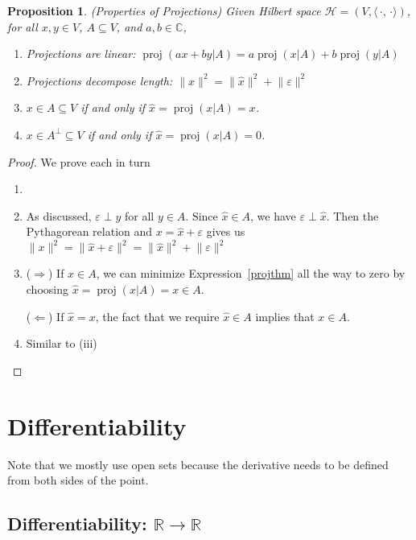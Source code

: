 \documentclass[12pt]{article}
\numberwithin{equation}{section} %
\theoremstyle{plain}
\newtheorem{prop}[thm]{Proposition}
\theoremstyle{definition}
\theoremstyle{remark}
\newcommand{\proj}{\operatorname{proj}}
\newcommand{\calH}{\mathcal{H}}
\newcommand{\R}{\mathbb{R}}
\newcommand{\C}{\mathbb{C}}
\begin{document}
\begin{prop}(Properties of Projections)
Given Hilbert space $\calH=(V,\langle\,\cdot,\,\cdot\rangle)$,
for all $x,y\in V$, $A\subseteq V$, and $a,b\in\C$,
\begin{enumerate}[label=\emph{(\roman*)}]
  \item \emph{Projections are linear}:
    $\proj(ax+by|A) = a\proj(x|A)+b\proj(y|A)$
  \item \emph{Projections decompose length}:
    $\lVert x\rVert^2
    = \lVert\hat{x}\rVert^2 + \lVert \varepsilon\rVert^2$
  \item $x\in A\subseteq V$ if and only if $\hat{x}=\proj(x|A)=x$.
  \item $x\in A^\perp \subseteq V$ if and only if
    $\hat{x}=\proj(x|A)=0$.
\end{enumerate}
\end{prop}
\begin{proof}
We prove each in turn
\begin{enumerate}[label=(\roman*)]
  \item
  \item As discussed, $\varepsilon\perp y$ for all $y\in A$.
    Since $\hat{x}\in A$, we have $\varepsilon\perp \hat{x}$.
    Then the Pythagorean relation and $x=\hat{x}+\varepsilon$ gives us
    $\lVert x\rVert^2 = \lVert \hat{x}+\varepsilon\rVert^2 =\lVert
    \hat{x}\rVert^2 + \lVert \varepsilon\rVert^2$
  \item
    ($\Rightarrow$)
    If $x\in A$, we can minimize Expression~\ref{projthm}
    all the way to zero by choosing $\hat{x}=\proj(x|A)=x\in A$.

    ($\Leftarrow$) If $\hat{x}=x$, the fact that we require
    $\hat{x}\in A$ implies that $x\in A$.
  \item Similar to (iii)
\end{enumerate}
\end{proof}


\clearpage
\section{Differentiability}

Note that we mostly use open sets because the derivative needs to be
defined from both sides of the point.

\subsection{Differentiability: $\R\rightarrow\R$}
\end{document}
